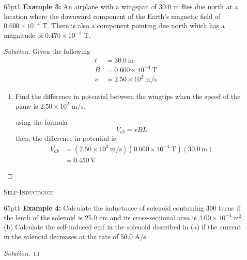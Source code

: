 \documentclass[12pt]{article}
\begin{document}
		\begin{hangparas}{65pt}{1}
			\textbf{Example 3:} An airplane with a wingspan of 30.0 m flies due north at a location where the downward component of the Earth's magnetic field of \(0.600\times10^{-4}\) T. There is also a component pointing due north which has a magnitude of \(0.470\times10^{-4}\) T.
		\end{hangparas}
		
		\begin{proof}[Solution]
			Given the following
			\begin{align*}
				l & = 30.0~\text{m} \\
				B & = 0.600\times10^{-4}~\text{T} \\
				v & = 2.50\times10^{2}~\text{m/s}
			\end{align*}
			\begin{enumerate}
				\item[(a)] Find the difference in potential between the wingtips when the speed of the plane is \(2.50\times10^2\) m/s.
				
					using the formula
					\[V_{ab} = vBL\]
					then, the difference in potential is
					\begin{align*}
						V_{ab} & = \left(2.50\times10^2~\text{m/s}\right)\left(0.600\times10^{-4}~\text{T}\right)\left(30.0~\text{m}\right) \\
						& = 0.450~\text{V}
					\end{align*}
			\end{enumerate}
		\end{proof}
	\newpage
	
	\begin{center}
		\hrulefill \quad \textsc{Self-Inductance} \quad \hrulefill
	\end{center}
	
	\begin{hangparas}{65pt}{1}
		\textbf{Example 4:} Calculate the inductance of solenoid containing 300 turns if the lenth of the solenoid is 25.0 cm and its cross-sectional area is \(4.00\times10^{-4}~\text{m}^2\). (b) Calculate the self-induced emf in the solenoid described in (a) if the current in the solenoid decreases at the rate of 50.0 A/s.
	\end{hangparas}
	
	\begin{proof}[Solution]
	
	\end{proof}
	
\end{document}
